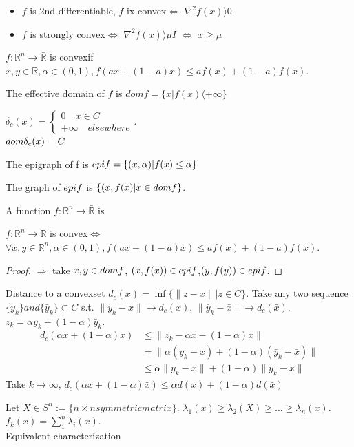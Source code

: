 \documentclass[11pt,fleqn]{book} %
\def\R{\mathbb{R}}
\newcommand{\cvx}{convex}
\begin{document}
\begin{example}
\begin{remark}
\begin{itemize}
\item $f$ is 2nd-differentiable, $f$ ix \cvx $\iff$ $\nabla^2f(x) \rangle  0$.
\item $f$ is strongly \cvx $\iff$ $\nabla^2f(x) \rangle  \mu I$ $\iff$ $x \ge \mu$
\end{itemize}
\end{remark}
\begin{definition}[2]
$f : \R^n \to \bar{\R} $ is \cvx  if $x, y  \in \R , \alpha \in (0,1), f(ax + (1-a)x) \le af(x) + (1-a)f(x)$.
\end{definition}
The effective domain of $f$ is $dom f = \{x | f(x) \langle + \infty \}$
\begin{example}
$\delta_c(x) = \begin{cases}
0 \quad  x \in C \\
+ \infty \quad elsewhere
\end{cases}$.\\
$dom \space \delta_c(x) = C$
\end{example}
\begin{definition}[Epigraph]
The epigraph of f is $epi \space f = \{(x,\alpha) | f(x) \le \alpha\}$
\end{definition}
The graph of $epi \space f$ is $\{ (x,f(x) | x \in dom \space f\}$.
\begin{definition}[III]
A function $f : \R^n \to \bar{\R}$ is %
\end{definition}
\begin{theorem}
$f : \R^n \to \bar{\R}$ is \cvx  $\iff$ $\forall x,y \in \R^n, \alpha \in (0,1), f(ax + (1-a)x) \le af(x) + (1-a)f(x)$.
\end{theorem}
\begin{proof}
$\Rightarrow$ take $x,y \in dom \space f$, $(x,f(x)) \in epi \space f$,$(y,f(y)) \in epi \space f$.
\end{proof}

\begin{example}[Distance]
Distance to a \cvx  set $d_c(x) = \inf \{ \| z-x \| | z \in C \}$. Take any two sequence $\{ y_k\} and \{ \bar{y}_k\} \subset C$ s.t. $\| y_k - x\| \to d_c(x)$, $\| \bar{y}_k - \bar{x}\| \to d_c(\bar{x})$. $z_k = \alpha y_k + (1 - \alpha) \bar{y}_k$.
\begin{align*}
d_c(\alpha x + (1-\alpha) \bar{x}) &\le \| z_k - \alpha x - (1 - \alpha) \bar{x}\| \\
& = \| \alpha(y_k - x) + (1 - \alpha)(\bar{y}_k - \bar{x})\| \\
& \le \alpha \| y_k - x\| + (1 - \alpha ) \|\bar{y}_k - \bar{x}\|
\end{align*}
Take $k \to \infty$, $d_c(\alpha x + (1 - \alpha) \bar{x}) \le \alpha d(x) + (1 - \alpha) d(\bar{x})$
\end{example}
\begin{example}[Eigenvalues]
Let $X \in S^n := \{ n \times n symmetric matrix\}$. $\lambda_1(x) \ge \lambda_2(X) \ge \ldots \ge \lambda_n(x)$.\\
$f_k(x) = \sum_{1}^n \lambda_i(x)$.\\
Equivalent characterization


\end{example}
\end{example}
\end{document}
